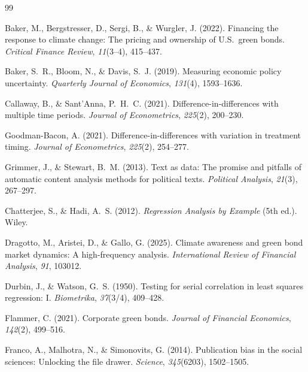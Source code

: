 \documentclass[12pt,a4paper]{article}
\begin{document}
\newpage


\begin{thebibliography}{99}

Baker, M., Bergstresser, D., Sergi, B., \& Wurgler, J. (2022).
Financing the response to climate change: The pricing and ownership of U.S.\ green bonds.
\textit{Critical Finance Review}, \textit{11}(3--4), 415--437.

Baker, S.~R., Bloom, N., \& Davis, S.~J. (2019).
Measuring economic policy uncertainty.
\textit{Quarterly Journal of Economics}, \textit{131}(4), 1593--1636.

Callaway, B., \& Sant'Anna, P.~H.~C. (2021).
Difference-in-differences with multiple time periods.
\textit{Journal of Econometrics}, \textit{225}(2), 200--230.

Goodman-Bacon, A. (2021).
Difference-in-differences with variation in treatment timing.
\textit{Journal of Econometrics}, \textit{225}(2), 254--277.

Grimmer, J., \& Stewart, B.~M. (2013).
Text as data: The promise and pitfalls of automatic content analysis methods for political texts.
\textit{Political Analysis}, \textit{21}(3), 267--297.

Chatterjee, S., \& Hadi, A.~S. (2012).
\textit{Regression Analysis by Example} (5th ed.).
Wiley.

Dragotto, M., Aristei, D., \& Gallo, G. (2025).
Climate awareness and green bond market dynamics: A high-frequency analysis.
\textit{International Review of Financial Analysis}, \textit{91}, 103012.

Durbin, J., \& Watson, G.~S. (1950).
Testing for serial correlation in least squares regression: I.
\textit{Biometrika}, \textit{37}(3/4), 409--428.

Flammer, C. (2021).
Corporate green bonds.
\textit{Journal of Financial Economics}, \textit{142}(2), 499--516.

Franco, A., Malhotra, N., \& Simonovits, G. (2014).
Publication bias in the social sciences: Unlocking the file drawer.
\textit{Science}, \textit{345}(6203), 1502--1505.


\end{thebibliography}
\end{document}
